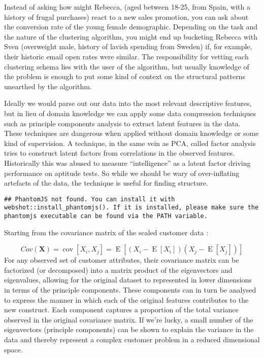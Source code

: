 \documentclass[]{tufte-book}
\theoremstyle{definition}
\theoremstyle{definition}
\theoremstyle{definition}
\theoremstyle{remark}
\begin{document}
Instead of asking how might Rebecca, (aged between 18-25, from Spain, with a history of frugal purchases) react to a new sales promotion, you can ask about the conversion rate of the young female demographic. Depending on the task and the nature of the clustering algorithm, you might end up bucketing Rebecca with Sven (overweight male, history of lavish spending from Sweden) if, for example, their historic email open rates were similar. The responsibility for vetting each clustering schema lies with the user of the algorithm, but usually knowledge of the problem is enough to put some kind of context on the structural patterns unearthed by the algorithm.

Ideally we would parse out our data into the most relevant descriptive features, but in lieu of domain knowledge we can apply some data compression techniques such as principle components analysis to extract latent features in the data. These techniques are dangerous when applied without domain knowledge or some kind of supervision. A technique, in the same vein as PCA, called factor analysis tries to construct latent factors from correlations in the observed features. Historically this was abused to measure ``intelligence'' as a latent factor driving performance on aptitude tests. So while we should be wary of over-inflating artefacts of the data, the technique is useful for finding structure.

\begin{verbatim}
## PhantomJS not found. You can install it with webshot::install_phantomjs(). If it is installed, please make sure the phantomjs executable can be found via the PATH variable.
\end{verbatim}

Starting from the covariance matrix of the scaled customer data :

\[ Cov(\mathbf{X}) = \operatorname{cov}[X_i, X_j] = \operatorname{E}[(X_i - \operatorname{E}[X_i])(X_j - \operatorname{E}[X_j])] \] For any observed set of customer attributes, their covariance matrix can be factorized (or decomposed) into a matrix product of the eigenvectors and eigenvalues, allowing for the original dataset to represented in lower dimensions in terms of the principle components. These components can in turn be analysed to express the manner in which each of the original features contributes to the new construct. Each component captures a proportion of the total variance observed in the original covariance matrix. If we're lucky, a small number of the eigenvectors (principle components) can be shown to explain the variance in the data and thereby represent a complex customer problem in a reduced dimensional space.
\end{document}
